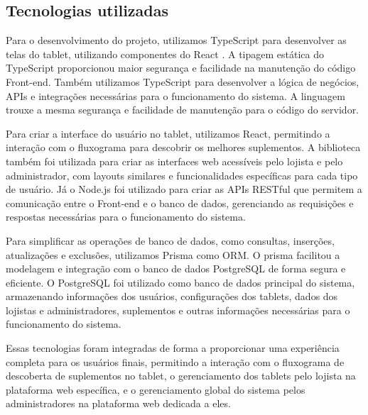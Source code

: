 \hypertarget{__RefHeading___Toc4741_3118176633}{}
\subsection{Tecnologias utilizadas}
\label{ages-i:text-h-0012}

Para o desenvolvimento do projeto, utilizamos TypeScript \cite{typescript-docs} para desenvolver as telas do tablet, utilizando componentes do React \cite{ages-iii-react}. A tipagem estática do TypeScript proporcionou maior segurança e facilidade na manutenção do código Front-end.
Também utilizamos TypeScript para desenvolver a lógica de negócios, APIs e integrações necessárias para o funcionamento do sistema. A linguagem trouxe a mesma segurança e facilidade de manutenção para o código do servidor.

Para criar a interface do usuário no tablet, utilizamos React, permitindo a interação com o fluxograma para descobrir os melhores suplementos.
A biblioteca também foi utilizada para criar as interfaces web acessíveis pelo lojista e pelo administrador, com layouts similares e funcionalidades específicas para cada tipo de usuário.
Já o Node.js \cite{nodejs-docs} foi utilizado para criar as APIs RESTful que permitem a comunicação entre o Front-end e o banco de dados, gerenciando as requisições e respostas necessárias para o funcionamento do sistema.

Para simplificar as operações de banco de dados, como consultas, inserções, atualizações e exclusões, utilizamos Prisma \cite{prisma-docs} como ORM. O prisma facilitou a modelagem e integração com o banco de dados PostgreSQL \cite{ages-iv-postgresql} de forma segura e eficiente.
O PostgreSQL foi utilizado como banco de dados principal do sistema, armazenando informações dos usuários, configurações dos tablets, dados dos lojistas e administradores, suplementos e outras informações necessárias para o funcionamento do sistema.

Essas tecnologias foram integradas de forma a proporcionar uma experiência completa para os usuários finais, permitindo a interação com o fluxograma de descoberta de suplementos no tablet, o gerenciamento dos tablets pelo lojista na plataforma web específica, e o gerenciamento global do sistema pelos administradores na plataforma web dedicada a eles.\par
